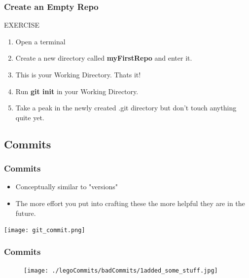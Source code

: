 \documentclass{beamer}
\begin{document}
\begin{frame}[fragile]
\frametitle{Create an Empty Repo}
    \begin{block}{EXERCISE}
        \begin{enumerate}
        \item Open a terminal
        \item Create a new directory called \textbf{myFirstRepo} and enter it.
	 \item This is your Working Directory. Thats it!
	 \item Run \textbf{git init} in your Working Directory.
        \item Take a peak in the newly created .git directory but don't touch anything quite yet.
        \end{enumerate}
    \end{block}

\end{frame}

\subsection{Commits}

\begin{frame}[fragile]
\frametitle{Commits}
\begin{itemize}
\item Conceptually similar to "versions"
\item The more effort you put into crafting these the more helpful they are in the future.
\end{itemize}
\texttt{[image: git\_commit.png]}
\end{frame}

\begin{frame}[fragile]
	\frametitle{Commits}
	\begin{figure}
		\centering
		\texttt{[image: ./legoCommits/badCommits/1added\_some\_stuff.jpg]}
	\end{figure}
\end{frame}
\end{document}
